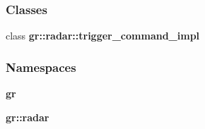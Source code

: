 \subsubsection*{Classes}
\begin{DoxyCompactItemize}
\item 
class {\bf gr\+::radar\+::trigger\+\_\+command\+\_\+impl}
\end{DoxyCompactItemize}
\subsubsection*{Namespaces}
\begin{DoxyCompactItemize}
\item 
 {\bf gr}
\item 
 {\bf gr\+::radar}
\end{DoxyCompactItemize}
